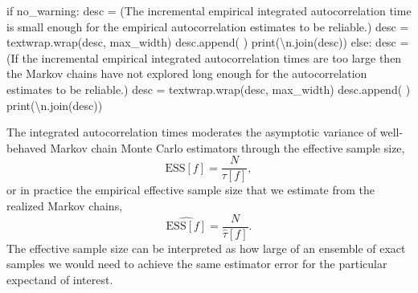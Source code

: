 \documentclass[
  letterpaper,
  DIV=11,
  numbers=noendperiod]{scrartcl}
\newenvironment{Shaded}{\begin{snugshade}}{\end{snugshade}}
\newcommand{\BuiltInTok}[1]{\textcolor[rgb]{0.00,0.23,0.31}{#1}}
\newcommand{\CharTok}[1]{\textcolor[rgb]{0.13,0.47,0.30}{#1}}
\newcommand{\ControlFlowTok}[1]{\textcolor[rgb]{0.00,0.23,0.31}{#1}}
\newcommand{\NormalTok}[1]{\textcolor[rgb]{0.00,0.23,0.31}{#1}}
\newcommand{\OperatorTok}[1]{\textcolor[rgb]{0.37,0.37,0.37}{#1}}
\newcommand{\StringTok}[1]{\textcolor[rgb]{0.13,0.47,0.30}{#1}}
\begin{document}
\begin{Shaded}
\begin{Highlighting}[]
  \ControlFlowTok{if}\NormalTok{ no\_warning:}
\NormalTok{    desc }\OperatorTok{=}\NormalTok{ (}\StringTok{\textquotesingle{}The incremental empirical integrated autocorrelation \textquotesingle{}}
            \StringTok{\textquotesingle{}time is small enough for the empirical autocorrelation \textquotesingle{}}
            \StringTok{\textquotesingle{}estimates to be reliable.\textquotesingle{}}\NormalTok{)}
\NormalTok{    desc }\OperatorTok{=}\NormalTok{ textwrap.wrap(desc, max\_width)}
\NormalTok{    desc.append(}\StringTok{\textquotesingle{} \textquotesingle{}}\NormalTok{)}
    \BuiltInTok{print}\NormalTok{(}\StringTok{\textquotesingle{}}\CharTok{\textbackslash{}n}\StringTok{\textquotesingle{}}\NormalTok{.join(desc))}
  \ControlFlowTok{else}\NormalTok{:}
\NormalTok{    desc }\OperatorTok{=}\NormalTok{ (}\StringTok{\textquotesingle{}If the incremental empirical integrated autocorrelation \textquotesingle{}}
            \StringTok{\textquotesingle{}times are too large then the Markov \textquotesingle{}}
            \StringTok{\textquotesingle{}chains have not explored long enough for the \textquotesingle{}}
            \StringTok{\textquotesingle{}autocorrelation estimates to be reliable.\textquotesingle{}}\NormalTok{)}
\NormalTok{    desc }\OperatorTok{=}\NormalTok{ textwrap.wrap(desc, max\_width)}
\NormalTok{    desc.append(}\StringTok{\textquotesingle{} \textquotesingle{}}\NormalTok{)}
    \BuiltInTok{print}\NormalTok{(}\StringTok{\textquotesingle{}}\CharTok{\textbackslash{}n}\StringTok{\textquotesingle{}}\NormalTok{.join(desc))}
\end{Highlighting}
\end{Shaded}

The integrated autocorrelation times moderates the asymptotic variance
of well-behaved Markov chain Monte Carlo estimators through the
effective sample size, \[
\text{ESS}[f] = \frac{N}{\tau[f]},
\] or in practice the empirical effective sample size that we estimate
from the realized Markov chains, \[
\hat{\text{ESS}[f]} = \frac{N}{\hat{\tau}[f]}.
\] The effective sample size can be interpreted as how large of an
ensemble of exact samples we would need to achieve the same estimator
error for the particular expectand of interest.
\end{document}
